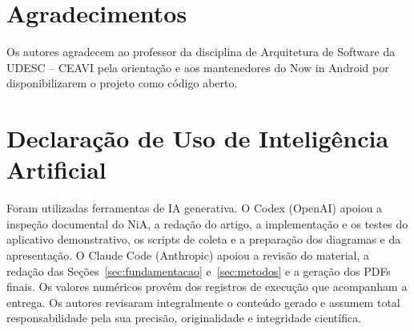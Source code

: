 \maketitle
{}














\section*{Agradecimentos}
Os autores agradecem ao professor da disciplina de Arquitetura de Software
da UDESC -- CEAVI pela orientação e aos mantenedores do Now in Android por
disponibilizarem o projeto como código aberto.

\section*{Declaração de Uso de Inteligência Artificial}
Foram utilizadas ferramentas de IA generativa. O Codex (OpenAI) apoiou a
inspeção documental do NiA, a redação do artigo, a implementação e os testes
do aplicativo demonstrativo, os scripts de coleta e a preparação dos
diagramas e da apresentação. O Claude Code (Anthropic) apoiou a revisão do
material, a redação das Seções~\ref{sec:fundamentacao} e~\ref{sec:metodos}
e a geração dos PDFs finais. Os valores numéricos provêm dos registros de
execução que acompanham a entrega. Os autores revisaram integralmente o
conteúdo gerado e assumem total responsabilidade pela sua precisão,
originalidade e integridade científica.




